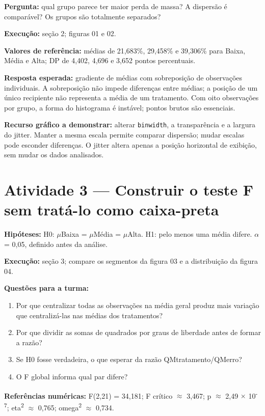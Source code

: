 \textbf{Pergunta:} qual grupo parece ter maior perda de massa? A dispersão é comparável? Os grupos são totalmente separados?

\textbf{Execução:} seção 2; figuras 01 e 02.

\textbf{Valores de referência:} médias de 21,683\%, 29,458\% e 39,306\% para Baixa, Média e Alta; DP de 4,402, 4,696 e 3,652 pontos percentuais.

\textbf{Resposta esperada:} gradiente de médias com sobreposição de observações individuais. A sobreposição não impede diferenças entre médias; a posição de um único recipiente não representa a média de um tratamento. Com oito observações por grupo, a forma do histograma é instável; pontos brutos são essenciais.

\textbf{Recurso gráfico a demonstrar:} alterar \texttt{binwidth}, a transparência e a largura do jitter. Manter a mesma escala permite comparar dispersão; mudar escalas pode esconder diferenças. O jitter altera apenas a posição horizontal de exibição, sem mudar os dados analisados.

\section{Atividade 3 --- Construir o teste F sem tratá-lo como caixa-preta}

\textbf{Hipóteses:} H0: \ensuremath{\mu}Baixa = \ensuremath{\mu}Média = \ensuremath{\mu}Alta. H1: pelo menos uma média difere. \ensuremath{\alpha} = 0,05, definido antes da análise.

\textbf{Execução:} seção 3; compare os segmentos da figura 03 e a distribuição da figura 04.

\textbf{Questões para a turma:}

\begin{enumerate}
\item Por que centralizar todas as observações na média geral produz mais variação que centralizá-las nas médias dos tratamentos?
\item Por que dividir as somas de quadrados por graus de liberdade antes de formar a razão?
\item Se H0 fosse verdadeira, o que esperar da razão QMtratamento/QMerro?
\item O F global informa qual par difere?
\end{enumerate}

\textbf{Referências numéricas:} F(2,21) = 34,181; F crítico \ensuremath{\approx} 3,467; p \ensuremath{\approx} 2,49 \ensuremath{\times} 10\textsuperscript{-}\textsuperscript{7}; eta\textsuperscript{2} \ensuremath{\approx} 0,765; omega\textsuperscript{2} \ensuremath{\approx} 0,734.

